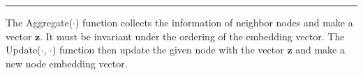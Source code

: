 \documentclass{article}
\begin{document}
            \begin{algorithm}[H]
                \DontPrintSemicolon
                \caption{Simple message passing neural network}


                \BlankLine
                \hrule

                
            \end{algorithm}

        The Aggregate($\cdot$) function collects the information of neighbor nodes and make
        a vector $\textbf{z}$. It must be invariant under the ordering of the embedding vector.
        The Update($\cdot$, $\cdot$) function then update the given node with the vector $\textbf{z}$
        and make a new node embedding vector.
\end{document}

